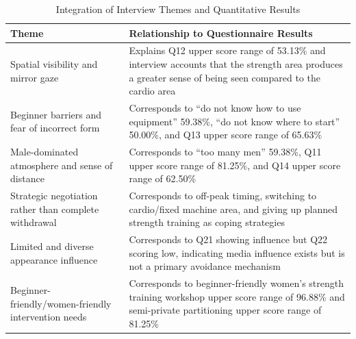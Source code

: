 \begin{table}[H]
\centering
\small
\caption{Integration of Interview Themes and Quantitative Results}
\label{tab:qual_themes_actual}
\begin{tabularx}{\textwidth}{lX}
\toprule
Theme & Relationship to Questionnaire Results \\
\midrule
Spatial visibility and mirror gaze & Explains Q12 upper score range of 53.13\% and interview accounts that the strength area produces a greater sense of being seen compared to the cardio area \\
Beginner barriers and fear of incorrect form & Corresponds to ``do not know how to use equipment'' 59.38\%, ``do not know where to start'' 50.00\%, and Q13 upper score range of 65.63\% \\
Male-dominated atmosphere and sense of distance & Corresponds to ``too many men'' 59.38\%, Q11 upper score range of 81.25\%, and Q14 upper score range of 62.50\% \\
Strategic negotiation rather than complete withdrawal & Corresponds to off-peak timing, switching to cardio/fixed machine area, and giving up planned strength training as coping strategies \\
Limited and diverse appearance influence & Corresponds to Q21 showing influence but Q22 scoring low, indicating media influence exists but is not a primary avoidance mechanism \\
Beginner-friendly/women-friendly intervention needs & Corresponds to beginner-friendly women's strength training workshop upper score range of 96.88\% and semi-private partitioning upper score range of 81.25\% \\
\bottomrule
\end{tabularx}
\end{table}
